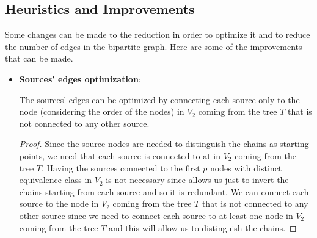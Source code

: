 \subsection{Heuristics and Improvements}
Some changes can be made to the reduction in order to optimize it and to reduce the number of edges in the bipartite graph. Here are some of the improvements that can be made.

\begin{itemize}
    \item \textbf{Sources' edges optimization}:
    \begin{lemma} \label{lemma:sources_optimization}
        The sources' edges can be optimized by connecting each source only to the   node (considering the order of the nodes) in $V_2$ coming from the tree $T$ that is not connected to any other source.
    \end{lemma}
    

    \begin{proof}
        Since the source nodes are needed to distinguish the chains as starting points, we need that each source is connected to at   in $V_2$ coming from the tree $T$. Having the sources connected to the first $p$ nodes with distinct equivalence class in $V_2$ is not necessary since allows us just to invert the chains starting from each source and so it is redundant. We can connect each source to the  node in $V_2$ coming from the tree $T$ that is not connected to any other source since we need to connect each source to at least one node in $V_2$ coming from the tree $T$ and this will allow us to distinguish the chains.
    \end{proof}


\end{itemize}
